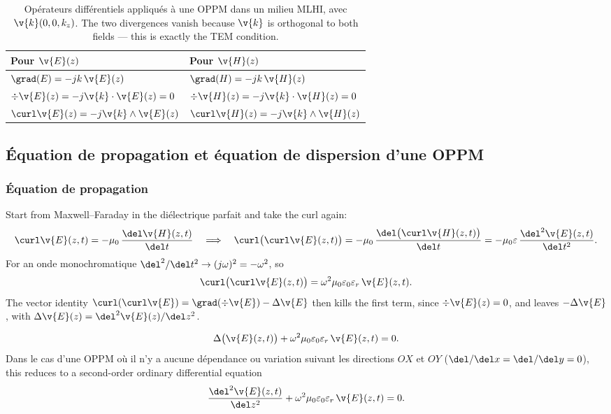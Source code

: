 \begin{table}[h!]
  \centering
  \begin{tabular}{@{}ll@{}}
    \toprule
    \textbf{Pour $\v{E}(z)$} & \textbf{Pour $\v{H}(z)$} \\
    \midrule
    $\grad(E) = -jk\,\v{E}(z)$
      & $\grad(H) = -jk\,\v{H}(z)$ \\[4pt]
    $\div \v{E}(z) = -j\v{k}\cdot\v{E}(z) = 0$
      & $\div \v{H}(z) = -j\v{k}\cdot\v{H}(z) = 0$ \\[4pt]
    $\curl \v{E}(z) = -j\v{k}\wedge\v{E}(z)$
      & $\curl \v{H}(z) = -j\v{k}\wedge\v{H}(z)$ \\
    \bottomrule
  \end{tabular}
  \caption*{\small Opérateurs différentiels appliqués à une OPPM dans un milieu
  MLHI, avec $\v{k}(0,0,k_z)$. The two divergences vanish because $\v{k}$ is
  orthogonal to both fields --- this is exactly the TEM condition.}
\end{table}

\subsection{Équation de propagation et équation de dispersion d'une OPPM}

\subsubsection{Équation de propagation}

Start from Maxwell--Faraday in the diélectrique parfait and take the curl again:
\[
  \curl \v{E}(z,t) = -\mu_0\,\frac{\del \v{H}(z,t)}{\del t}
  \quad\Longrightarrow\quad
  \curl\big(\curl \v{E}(z,t)\big)
    = -\mu_0\,\frac{\del\big(\curl \v{H}(z,t)\big)}{\del t}
    = -\mu_0\varepsilon\,\frac{\del^2 \v{E}(z,t)}{\del t^2}.
\]
For an onde monochromatique $\del^2/\del t^2 \to (j\omega)^2 = -\omega^2$, so
\[
  \curl\big(\curl \v{E}(z,t)\big) = \omega^2\mu_0\varepsilon_0\varepsilon_r\,\v{E}(z,t).
\]
The vector identity
$\curl(\curl \v{E}) = \grad(\div \v{E}) - \Delta \v{E}$ then kills the first
term, since $\div \v{E}(z) = 0$, and leaves $-\Delta \v{E}$, with
$\Delta \v{E}(z) = \del^2\v{E}(z)/\del z^2$.

\begin{theorem}
  \[
    \Delta\big(\v{E}(z,t)\big) + \omega^2\mu_0\varepsilon_0\varepsilon_r\,\v{E}(z,t) = 0.
  \]
  Dans le cas d'une OPPM où il n'y a aucune dépendance ou variation suivant les
  directions $OX$ et $OY$ ($\del/\del x = \del/\del y = 0$), this reduces to a
  second-order ordinary differential equation
  \[
    \frac{\del^2 \v{E}(z,t)}{\del z^2}
      + \omega^2\mu_0\varepsilon_0\varepsilon_r\,\v{E}(z,t) = 0.
  \]
\end{theorem}

